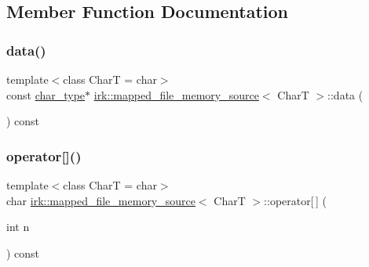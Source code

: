 \subsection{Member Function Documentation}
\mbox{\label{classirk_1_1mapped__file__memory__source_aed12180cbed20420b7d783b5a9705eb3}} 
\subsubsection{\texorpdfstring{data()}{data()}}
{\footnotesize\ttfamily template$<$class CharT  = char$>$ \\
const \mbox{\hyperlink{classirk_1_1mapped__file__memory__source_a9b4319787fae825c6a27be1e58447386}{char\+\_\+type}}$\ast$ \mbox{\hyperlink{classirk_1_1mapped__file__memory__source}{irk\+::mapped\+\_\+file\+\_\+memory\+\_\+source}}$<$ CharT $>$\+::data (\begin{DoxyParamCaption}{ }\end{DoxyParamCaption}) const\hspace{0.3cm}{\ttfamily [inline]}}

\mbox{\label{classirk_1_1mapped__file__memory__source_a121d8c1899ac93d3dc215512ba3a5f1f}} 
\subsubsection{\texorpdfstring{operator[]()}{operator[]()}}
{\footnotesize\ttfamily template$<$class CharT  = char$>$ \\
char \mbox{\hyperlink{classirk_1_1mapped__file__memory__source}{irk\+::mapped\+\_\+file\+\_\+memory\+\_\+source}}$<$ CharT $>$\+::operator\mbox{[}$\,$\mbox{]} (\begin{DoxyParamCaption}\item[{int}]{n }\end{DoxyParamCaption}) const\hspace{0.3cm}{\ttfamily [inline]}}

